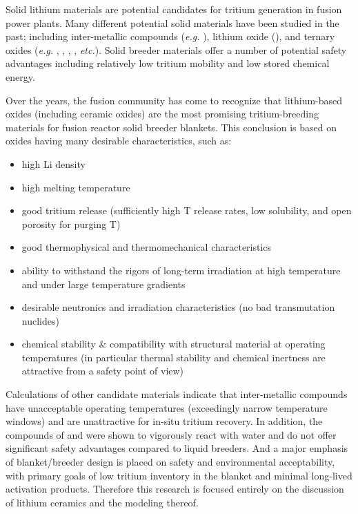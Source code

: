 
Solid lithium materials are potential candidates for tritium generation in fusion power plants. Many different potential solid materials have been studied in the past; including inter-metallic compounds (\textit{e.g.} ), lithium oxide (\lio), and ternary oxides (\textit{e.g.} \lis, \lit, \lial, \liz, \textit{etc.}). Solid breeder materials offer a number of potential safety advantages including relatively low tritium mobility and low stored chemical energy.

Over the years, the fusion community has come to recognize that lithium-based oxides (including ceramic oxides) are the most promising tritium-breeding materials for fusion reactor solid breeder blankets. This conclusion is based on oxides having many desirable characteristics, such as: 
\begin{itemize}
\item{high Li density}
\item{high melting temperature}
\item good tritium release (sufficiently high T release rates, low solubility, and open porosity for purging T)
\item good thermophysical and thermomechanical characteristics
\item ability to withstand the rigors of long-term irradiation at high temperature and under large temperature gradients
\item{desirable neutronics and irradiation characteristics (no bad transmutation nuclides)}
\item{chemical stability \& compatibility with structural material at operating temperatures (in particular thermal stability and chemical inertness are attractive from a safety point of view)}
\end{itemize}

Calculations of other candidate materials indicate that inter-metallic compounds have unacceptable operating temperatures (exceedingly narrow temperature windows) and are unattractive for in-situ tritium recovery. In addition, the compounds of  and  were shown to vigorously react with water and do not offer significant safety advantages compared to liquid breeders.\cite{Clemmer1980,Abdou1975c} And a major emphasis of blanket/breeder design is placed on safety and environmental acceptability, with primary goals of low tritium inventory in the blanket and minimal long-lived activation products. Therefore this research is focused entirely on the discussion of lithium ceramics and the modeling thereof.

